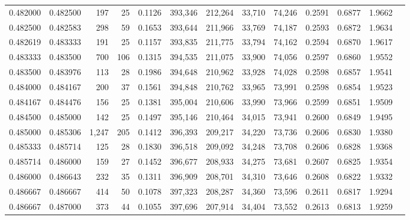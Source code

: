 \begin{tabular}{rrrrrrrrrrrrr}
0.482000 & 0.482500 &   197 &  25 &                                     0.1126 & 393,346 & 212,264 &  33,710 &  74,246 & 0.2591 & 0.6877 & 1.9662 \\
0.482500 & 0.482583 &   298 &  59 &                                     0.1653 & 393,644 & 211,966 &  33,769 &  74,187 & 0.2593 & 0.6872 & 1.9634 \\
0.482619 & 0.483333 &   191 &  25 &                                     0.1157 & 393,835 & 211,775 &  33,794 &  74,162 & 0.2594 & 0.6870 & 1.9617 \\
0.483333 & 0.483500 &   700 & 106 &                                     0.1315 & 394,535 & 211,075 &  33,900 &  74,056 & 0.2597 & 0.6860 & 1.9552 \\
0.483500 & 0.483976 &   113 &  28 &                                     0.1986 & 394,648 & 210,962 &  33,928 &  74,028 & 0.2598 & 0.6857 & 1.9541 \\
0.484000 & 0.484167 &   200 &  37 &                                     0.1561 & 394,848 & 210,762 &  33,965 &  73,991 & 0.2598 & 0.6854 & 1.9523 \\
0.484167 & 0.484476 &   156 &  25 &                                     0.1381 & 395,004 & 210,606 &  33,990 &  73,966 & 0.2599 & 0.6851 & 1.9509 \\
0.484500 & 0.485000 &   142 &  25 &                                     0.1497 & 395,146 & 210,464 &  34,015 &  73,941 & 0.2600 & 0.6849 & 1.9495 \\
0.485000 & 0.485306 & 1,247 & 205 &                                     0.1412 & 396,393 & 209,217 &  34,220 &  73,736 & 0.2606 & 0.6830 & 1.9380 \\
0.485333 & 0.485714 &   125 &  28 &                                     0.1830 & 396,518 & 209,092 &  34,248 &  73,708 & 0.2606 & 0.6828 & 1.9368 \\
0.485714 & 0.486000 &   159 &  27 &                                     0.1452 & 396,677 & 208,933 &  34,275 &  73,681 & 0.2607 & 0.6825 & 1.9354 \\
0.486000 & 0.486643 &   232 &  35 &                                     0.1311 & 396,909 & 208,701 &  34,310 &  73,646 & 0.2608 & 0.6822 & 1.9332 \\
0.486667 & 0.486667 &   414 &  50 &                                     0.1078 & 397,323 & 208,287 &  34,360 &  73,596 & 0.2611 & 0.6817 & 1.9294 \\
0.486667 & 0.487000 &   373 &  44 &                                     0.1055 & 397,696 & 207,914 &  34,404 &  73,552 & 0.2613 & 0.6813 & 1.9259 \\

\end{tabular}

